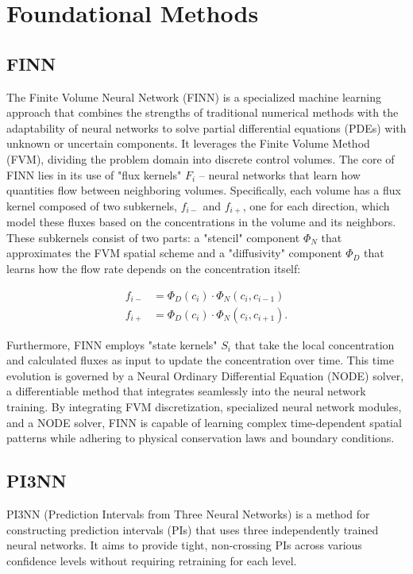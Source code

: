 \documentclass{article}
\begin{document}
\section{Foundational Methods}
\subsection{FINN}

The Finite Volume Neural Network (FINN) is a specialized machine learning approach that combines the strengths of traditional numerical methods with the adaptability of neural networks to solve partial differential equations (PDEs) with unknown or uncertain components. It leverages the Finite Volume Method (FVM), dividing the problem domain into discrete control volumes. The core of FINN lies in its use of "flux kernels" $F_i$ – neural networks that learn how quantities flow between neighboring volumes. Specifically, each volume has a flux kernel composed of two subkernels, $f_{i-}$ and $f_{i+}$, one for each direction, which model these fluxes based on the concentrations in the volume and its neighbors. These subkernels consist of two parts: a "stencil" component $\Phi_N$ that approximates the FVM spatial scheme and a "diffusivity" component $\Phi_D$ that learns how the flow rate depends on the concentration itself:

\begin{align*}
    f_{i-} &= \Phi_D(c_i) \cdot \Phi_N(c_i, c_{i-1}) \\
    f_{i+} &= \Phi_D(c_i) \cdot \Phi_N(c_i, c_{i+1}).
\end{align*}

Furthermore, FINN employs "state kernels" $S_i$ that take the local concentration and calculated fluxes as input to update the concentration over time. This time evolution is governed by a Neural Ordinary Differential Equation (NODE) solver, a differentiable method that integrates seamlessly into the neural network training. By integrating FVM discretization, specialized neural network modules, and a NODE solver, FINN is capable of learning complex time-dependent spatial patterns while adhering to physical conservation laws and boundary conditions.



\subsection{PI3NN}
PI3NN (Prediction Intervals from Three Neural Networks) \cite{pi3nn} is a method for constructing prediction intervals (PIs) that uses three independently trained neural networks. It aims to provide tight, non-crossing PIs across various confidence levels without requiring retraining for each level.
\end{document}
